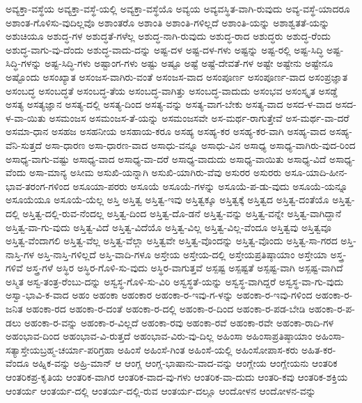 {ಅವ್ಯಕ್ತಾ-ವಸ್ಥೆಯ
ಅವ್ಯಕ್ತಾ-ವಸ್ಥೆ-ಯಲ್ಲಿ
ಅವ್ಯಕ್ತಾ-ವಸ್ಥೆಯೊ
ಅವ್ಯಯ
ಅವ್ಯವಸ್ಥಿತ-ವಾಗಿ-ರುವುದು
ಅವ್ಯ-ವಸ್ಥೆ-ಯಾದರೂ
ಅಶಾಂತ-ಗೊಳಿಸು-ವುದಿಲ್ಲವೊ
ಅಶಾಂತರೊ
ಅಶಾಂತಿ
ಅಶಾಂತಿ-ಗಳಿಲ್ಲದೆ
ಅಶಾಂತಿ-ಯನ್ನು
ಅಶಾಶ್ವತತೆ-ಯನ್ನು
ಅಶುಚಿಯೂ
ಅಶುದ್ಧ-ಗಳ
ಅಶುದ್ಧತೆ-ಗಳೆಲ್ಲ
ಅಶುದ್ಧ-ನಾಗಿ-ರುವುದು
ಅಶುದ್ಧ-ರಾದ
ಅಶುದ್ಧರು
ಅಶುದ್ಧ-ರೆಂದು
ಅಶುದ್ಧ-ವಾಗು-ವು-ದೆಂದು
ಅಶುದ್ಧ-ವಾದು-ದನ್ನು
ಅಷ್ಟ-ದಳ
ಅಷ್ಟ-ದಳ-ಗಳು
ಅಷ್ಟನ್ನು
ಅಷ್ಟ-ರಲ್ಲಿ
ಅಷ್ಟ-ಸಿದ್ಧಿ
ಅಷ್ಟ-ಸಿದ್ಧಿ-ಗಳನ್ನು
ಅಷ್ಟ-ಸಿದ್ಧಿ-ಗಳು
ಅಷ್ಟಾಂಗ-ಗಳು
ಅಷ್ಟು
ಅಷ್ಟೂ
ಅಷ್ಟೆ
ಅಷ್ಟೆ-ದೇವತೆ-ಗಳ
ಅಷ್ಟೇ
ಅಷ್ಟೇನು
ಅಷ್ಟೇನೂ
ಅಷ್ಟೊಂದು
ಅಸಂಖ್ಯಾತ
ಅಸಂಜಸ-ವಾಗಿರು-ವಂತೆ
ಅಸಂಜಸ-ವಾದ
ಅಸಂಪೂರ್ಣ
ಅಸಂಪೂರ್ಣ-ವಾದ
ಅಸಂಪ್ರಜ್ಞಾತ
ಅಸಂಬದ್ಧ
ಅಸಂಬದ್ಧತೆ
ಅಸಂಬದ್ಧ-ತೆಯ
ಅಸಂಬದ್ಧ-ವಾಗಿತ್ತು
ಅಸಂಬದ್ಧ-ವಾದುದು
ಅಸಂಭವ
ಅಸಂಸ್ಕೃತ
ಅಸಡ್ಡೆ
ಅಸತ್ಯ
ಅಸತ್ಯಜ್ಞಾನ
ಅಸತ್ಯ-ದಲ್ಲಿ
ಅಸತ್ಯ-ದಿಂದ
ಅಸತ್ಯ-ವನ್ನು
ಅಸತ್ಯ-ವಾಗ-ಬೇಕು
ಅಸತ್ಯ-ವಾದ
ಅಸದ-ಳ-ವಾದ
ಅಸದ-ಳ-ವಾ-ಯಿತು
ಅಸಮಂಜಸ
ಅಸಮಂಜಸ-ತೆ-ಯನ್ನು
ಅಸಮಂಜಸವೇ
ಅಸ-ಮರ್ಥ-ರಾಗುತ್ತೇವೆ
ಅಸ-ಮರ್ಥ-ವಾ-ದರೆ
ಅಸಮಾ-ಧಾನ
ಅಸಹಜ
ಅಸಹನೀಯ
ಅಸಹಾಯ-ಕರೂ
ಅಸಹ್ಯ
ಅಸಹ್ಯ-ಕರ
ಅಸಹ್ಯ-ಕರ-ವಾಗಿ
ಅಸಹ್ಯ-ವಾದ
ಅಸಹ್ಯ-ವೆನಿ-ಸುತ್ತದೆ
ಅಸಾ-ಧಾರಣ
ಅಸಾ-ಧಾರಣ-ವಾದ
ಅಸಾಧು-ವನ್ನೂ
ಅಸಾಧು-ವಿನ
ಅಸಾಧ್ಯ
ಅಸಾಧ್ಯ-ವಾಗಿರು-ವುದ-ರಿಂದ
ಅಸಾಧ್ಯ-ವಾಗು-ವಷ್ಟು
ಅಸಾಧ್ಯ-ವಾದ
ಅಸಾಧ್ಯ-ವಾ-ದರೆ
ಅಸಾಧ್ಯ-ವಾದುದು
ಅಸಾಧ್ಯ-ವಾಯಿತು
ಅಸಾಧ್ಯ-ವಿದೆ
ಅಸಾಧ್ಯ-ವೆಂದು
ಅಸಾ-ಮಾನ್ಯ
ಅಸೀಮ
ಅಸುಖಿ-ಯನ್ನಾಗಿ
ಅಸುಖಿ-ಯಾಗಿರು-ವೆವು
ಅಸುರರ
ಅಸುರರು
ಅಸೂ-ಯಾದಿ-ಹೀನ-ಭಾವ-ತರಂಗ-ಗಳಿಂದ
ಅಸೂಯಾ-ಪರರು
ಅಸೂಯೆ
ಅಸೂಯೆ-ಗಳನ್ನು
ಅಸೂಯೆ-ಪ-ಡು-ವುದು
ಅಸೂಯೆ-ಯನ್ನೂ
ಅಸೂಯೆಯೂ
ಅಸೂಯೆ-ಯೆಲ್ಲ
ಅಸ್ತಿ
ಅಸ್ತಿತ್ವ
ಅಸ್ತಿತ್ವ-ಇವು
ಅಸ್ತಿತ್ವಕ್ಕೂ
ಅಸ್ತಿತ್ವಕ್ಕೆ
ಅಸ್ತಿತ್ವದ
ಅಸ್ತಿತ್ವ-ದಂತೆಯೊ
ಅಸ್ತಿತ್ವ-ದಲ್ಲಿ
ಅಸ್ತಿತ್ವ-ದಲ್ಲಿ-ರುವ-ನೆಂದಲ್ಲ
ಅಸ್ತಿತ್ವ-ದಿಂದ
ಅಸ್ತಿತ್ವ-ದೊ-ಡನೆ
ಅಸ್ತಿತ್ವ-ವನ್ನು
ಅಸ್ತಿತ್ವ-ವನ್ನೇ
ಅಸ್ತಿತ್ವ-ವಾಗಿದ್ದಾನೆ
ಅಸ್ತಿತ್ವ-ವಾ-ಗು-ವುದು
ಅಸ್ತಿತ್ವ-ವಿದೆ
ಅಸ್ತಿತ್ವ-ವಿದೆಯೊ
ಅಸ್ತಿತ್ವ-ವಿಲ್ಲ
ಅಸ್ತಿತ್ವ-ವಿಲ್ಲ-ವೆಂದೂ
ಅಸ್ತಿತ್ವವು
ಅಸ್ತಿತ್ವವೂ
ಅಸ್ತಿತ್ವ-ವೆಂದಾಗಲಿ
ಅಸ್ತಿತ್ವ-ವೆಲ್ಲ
ಅಸ್ತಿತ್ವ-ವೆಲ್ಲಾ
ಅಸ್ತಿತ್ವವೇ
ಅಸ್ತಿತ್ವ-ವೊಂದನ್ನು
ಅಸ್ತಿತ್ವ-ವೊಂದು
ಅಸ್ತಿತ್ವ-ಸಾ-ಗರದ
ಅಸ್ತಿ-ನಾಸ್ತಿ-ಗಳ
ಅಸ್ತಿ-ನಾಸ್ತಿ-ಗಳಿಲ್ಲದೆ
ಅಸ್ತಿ-ವಾದಿ-ಗಳೂ
ಅಸ್ತೇಯ
ಅಸ್ತೇಯ-ದಲ್ಲಿ
ಅಸ್ತೇಯಪ್ರತಿಷ್ಠಾಯಾಂ
ಅಸ್ತೇಯಾ
ಅಸ್ತ್ರ-ಗಳಿವೆ
ಅಸ್ತ್ರ-ಗಳೆ
ಅಸ್ಥಿರ
ಅಸ್ಥಿರ-ಗೊಳಿ-ಸು-ವುದು
ಅಸ್ಥಿರ-ವಾಗುತ್ತವೆ
ಅಸ್ಪಷ್ಟ
ಅಸ್ಪಷ್ಟತೆ
ಅಸ್ಪಷ್ಟ-ವಾಗಿ
ಅಸ್ಪಷ್ಟ-ವಾಗಿದೆ
ಅಸ್ಮಿತ
ಅಸ್ವ-ತಂತ್ರ-ರೆಂಬು-ದನ್ನು
ಅಸ್ವಸ್ಥ-ಗೊಳಿ-ಸು-ವಿರಿ
ಅಸ್ವಸ್ಥತೆ-ಯನ್ನು
ಅಸ್ವಸ್ಥ-ವಾಗಿದ್ದರೆ
ಅಸ್ವಸ್ಥ-ವಾ-ಗು-ವುದು
ಅಸ್ವಾ-ಭಾವಿ-ಕ-ವಾದ
ಅಹಂ
ಅಹಂಕಾ
ಅಹಂಕಾರ
ಅಹಂಕಾ-ರ-ಇವು-ಗ-ಳನ್ನು
ಅಹಂಕಾ-ರ-ಇವು-ಗಳಿಂದ
ಅಹಂಕಾ-ರ-ಜನಿತ
ಅಹಂಕಾ-ರದ
ಅಹಂಕಾ-ರ-ದಂತೆ
ಅಹಂಕಾ-ರ-ದಲ್ಲಿ
ಅಹಂಕಾ-ರ-ದಿಂದ
ಅಹಂಕಾ-ರ-ಪಡ-ಬೇಡಿ
ಅಹಂಕಾ-ರ-ಪ-ಡಲು
ಅಹಂಕಾ-ರ-ವನ್ನು
ಅಹಂಕಾ-ರ-ವಿಲ್ಲದೆ
ಅಹಂಕಾ-ರವು
ಅಹಂಕಾ-ರವೆ
ಅಹಂಕಾ-ರವೇ
ಅಹಂಕಾ-ರಾದಿ-ಗಳ
ಅಹಂಭಾವ-ದಿಂದ
ಅಹಂಭಾವ-ವಿ-ರುತ್ತದೆ
ಅಹಂಭಾವ-ವಿರು-ವು-ದಿಲ್ಲ
ಅಹಿಂಸಾ
ಅಹಿಂಸಾಪ್ರತಿಷ್ಠಾಯಾಂ
ಅಹಿಂಸಾ-ಸತ್ಯಾಸ್ತೇಯಬ್ರಹ್ಮ-ಚರ್ಯಾ-ಪರಿಗ್ರಹಾ
ಅಹಿಂಸೆ
ಅಹಿಂಸೆ-ಗಿಂತ
ಅಹಿಂಸೆ-ಯಲ್ಲಿ
ಅಹಿಂಸೋಪಾಸ-ಕರು
ಅಹಿತ-ಕರ-ವೆಂದೂ
ಅಹ್ನಿಕ-ವನ್ನು
ಅಹ್ರಿ-ಮಾನ್
ಆ
ಆಂಗ್ಲ
ಆಂಗ್ಲ-ಭಾಷಾನು-ವಾದ-ವನ್ನು
ಆಂಗ್ಲೇಯ
ಆಂಗ್ಲೇಯನು
ಆಂತರಿಕ
ಆಂತರಿಕಪ್ರ-ಕೃತಿಯ
ಆಂತರಿಕ-ವಾಗಿರ
ಆಂತರಿಕ-ವಾದ-ವು-ಗಳು
ಆಂತರಿಕ-ವಾ-ದುದು
ಆಂತರಿ-ಕವು
ಆಂತರಿಕ-ಶಕ್ತಿಯ
ಆಂತರ್ಯ
ಆಂತರ್ಯ-ದಲ್ಲಿ
ಆಂತರ್ಯ-ದಲ್ಲಿ-ರುವ
ಆಂತರ್ಯ-ದಲ್ಲೂ
ಆಂದೋಳನ
ಆಂದೋಳನ-ವನ್ನು
}
